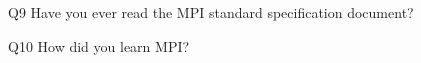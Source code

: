 \begin{description}%
\item{Q9} Have you ever read the MPI standard specification document?%
\item{Q10} How did you learn MPI?%
\end{description}%
